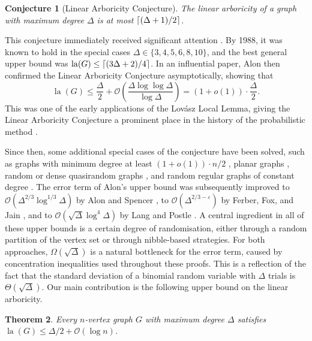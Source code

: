 \documentclass[11pt]{article}
\theoremstyle{plain}
\newtheorem{theorem}{Theorem}[section]
\newtheorem{conjecture}[theorem]{Conjecture}
\theoremstyle{definition}
\newcommand{\eps}{\varepsilon}
\newcommand{\cO}{\mathcal O}
\DeclarePairedDelimiter{\ceil}{\lceil}{\rceil}
\DeclareMathOperator{\la}{la}
\begin{document}
\begin{conjecture}[Linear Arboricity Conjecture]
    The linear arboricity of a graph with maximum degree $\Delta$ is at most $\ceil{(\Delta + 1)/2}$.
\end{conjecture}

This conjecture immediately received significant attention \cite{akiyama1981covering,enomoto1981linear,peroche1982partition,tomasta1982note,enomoto1984linear,guldan1986linear,guldan1986some}. By 1988, it was known to hold in the special cases $\Delta \in \{3,4,5,6,8,10\}$, and the best general upper bound was $\la(G) \le \ceil{(3\Delta +2)/4}$. In an influential paper, Alon \cite{alon1988linear} then confirmed the Linear Arboricity Conjecture asymptotically, showing that
\[
    \la(G) \le \frac{\Delta}{2} + \cO\left(\frac{\Delta \log \log \Delta}{\log \Delta}\right)=(1+o(1)) \cdot \frac{\Delta}{2}.
\]
This was one of the early applications of the Lov\'{a}sz Local Lemma, giving the Linear Arboricity Conjecture a prominent place in the history of the probabilistic method \cite{alon2016probabilistic}.

Since then, some additional special cases of the conjecture have been solved, such as graphs with minimum degree at least $(1+o(1)) \cdot n/2$ \cite{glock2016optimal,gao2024linear}, planar graphs \cite{wu1999linear, wu2008linear}, random or dense quasirandom graphs \cite{draganic2025optimal, glock2016optimal}, and random regular graphs of constant degree \cite{mcdiarmid1990linear}. The error term of Alon's upper bound was subsequently improved to $\cO(\Delta^{2/3} \log^{1/3} \Delta)$ by Alon and Spencer \cite{alon2016probabilistic}, to $\cO(\Delta^{2/3-\eps})$ by Ferber, Fox, and Jain \cite{ferber2020towards}, and to $\cO(\sqrt{\Delta} \log^4 \Delta)$ by Lang and Postle \cite{lang2023improved}. A central ingredient in all of these upper bounds is a certain degree of randomisation, either through a random partition of the vertex set or through nibble-based strategies. For both approaches, $\Omega(\sqrt{\Delta})$ is a natural bottleneck for the error term, caused by concentration inequalities used throughout these proofs. This is a reflection of the fact that the standard deviation of a binomial random variable with $\Delta$ trials is $\Theta(\sqrt{\Delta})$. Our main contribution is the following upper bound on the linear arboricity.

\begin{theorem}\label{thm:lineararboricitylogerror}
    Every $n$-vertex graph $G$ with maximum degree $\Delta$ satisfies $\la(G) \le \Delta / 2 + \cO(\log n)$.
\end{theorem}
\end{document}
